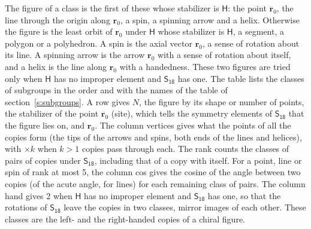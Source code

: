 \documentclass[10pt,a4paper]{article}
\numberwithin{equation}{section}
\newcommand{\grp}[1]{\mathsf{#1}}
\newcommand{\pointr}{\mathbf{r}}
\begin{document}
\leavevmode\label{n:head.figure}The figure of a class is the first of these whose stabilizer is $\grp{H}$: the point $\pointr_0$, the line through the origin along $\pointr_0$, a spin, a spinning arrow and a helix. Otherwise the figure is the least orbit of $\pointr_0$ under $\grp{H}$ whose stabilizer is $\grp{H}$, a segment, a polygon or a polyhedron. A spin is the axial vector $\pointr_0$, a sense of rotation about its line. A spinning arrow is the arrow $\pointr_0$ with a sense of rotation about itself, and a helix is the line along $\pointr_0$ with a handedness. These two figures are tried only when $\grp{H}$ has no improper element and $\grp{S_{18}}$ has one. The table lists the classes of subgroups in the order and with the names of the table of section~\ref{s:subgroups}. \label{n:head.site}A row gives $N$, the figure by its shape or number of points, the stabilizer of the point $\pointr_0$ (site), which tells the symmetry elements of $\grp{S_{18}}$ that the figure lies on, and $\pointr_0$. \label{n:head.vertices}The column vertices gives what the points of all the copies form (the tips of the arrows and spins, both ends of the lines and helices), with ${\times}k$ when $k > 1$ copies pass through each. \label{n:head.rank}The rank counts the classes of pairs of copies under $\grp{S_{18}}$, including that of a copy with itself. \label{n:head.cos}For a point, line or spin of rank at most 5, the column cos gives the cosine of the angle between two copies (of the acute angle, for lines) for each remaining class of pairs. \label{n:head.hand}The column hand gives 2 when $\grp{H}$ has no improper element and $\grp{S_{18}}$ has one, so that the rotations of $\grp{S_{18}}$ leave the copies in two classes, mirror images of each other. These classes are the left- and the right-handed copies of a chiral figure.
\end{document}
